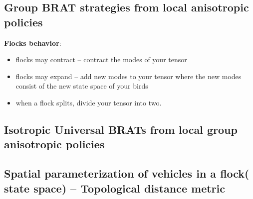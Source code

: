 \subsection{Group BRAT strategies from local anisotropic policies}

\textbf{Flocks behavior}:
%
\begin{itemize}
	\item flocks may contract -- contract the modes of your tensor 
	\item flocks may expand -- add new modes to your tensor where the new modes consist of the new state space of your birds
	\item when a flock splits, divide your tensor into two.
\end{itemize}

\subsection{Isotropic Universal BRATs from local group anisotropic policies}



\subsection{Spatial parameterization of vehicles in a flock( state space) -- Topological distance metric}

